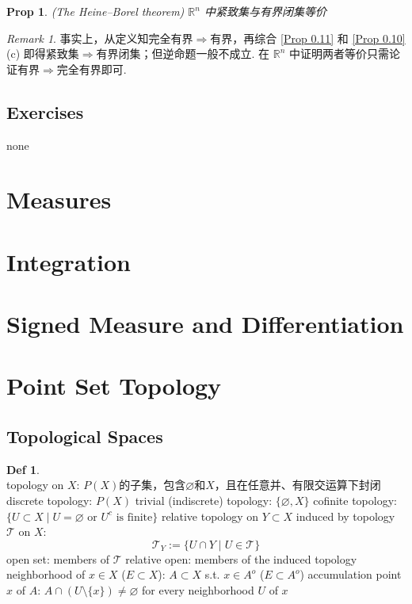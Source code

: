 \documentclass[hidelinks]{article}
\theoremstyle{definition}
\newtheorem*{defin}{Def}
\theoremstyle{plain}
\newtheorem{proposition}[theorem]{Prop}
\theoremstyle{remark}
\newtheorem*{remark}{Remark}
\begin{document}
\begin{proposition}(The Heine–Borel theorem)
$\mathbb{R}^n$ 中紧致集与有界闭集等价
\end{proposition}

\begin{remark}
事实上，从定义知完全有界$\Rightarrow$有界，再综合 \autoref{Prop 0.11} 和 \autoref{Prop 0.10} (c) 即得紧致集$\Rightarrow$有界闭集；但逆命题一般不成立. 在 $\mathbb{R}^n$ 中证明两者等价只需论证有界$\Rightarrow$完全有界即可.
\end{remark}


\subsection{Exercises}
none

\newpage



\section{Measures}
\newpage
\section{Integration}
\newpage
\section{Signed Measure and Differentiation}
\newpage




\section{Point Set Topology}

\subsection{Topological Spaces}
\begin{defin}~\\
topology on $X$: $P(X)$的子集，包含$\varnothing$和$X$，且在任意并、有限交运算下封闭 \newline
\indent discrete topology: $P(X)$ \newline
\indent trivial (indiscrete) topology: $\{\varnothing,X\}$ \newline
\indent cofinite topology: $\{U\subset X\mid U=\varnothing \textrm{ or } U^c \textrm{ is finite}\}$ \newline
relative topology on $Y\subset X$ induced by topology $\mathscr{T}$ on $X$:
$$\mathscr{T}_Y:=\{U\cap Y\mid U\in \mathscr{T}\}$$
open set: members of $\mathscr{T}$ \newline
relative open: members of the induced topology \newline
neighborhood of $x\in X$ ($E\subset X$): $A\subset X$ s.t. $x\in A^o$ ($E\subset A^o$) \newline
accumulation point $x$ of $A$: $A\cap (U\setminus\{x\})\neq \varnothing$ for every neighborhood $U$ of $x$
\end{defin}
\end{document}
